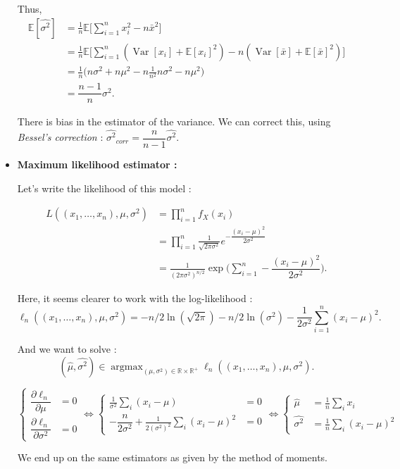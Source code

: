 \begin{itemize}
    Thus, 
    \begin{align*}
    \mathbb{E}[\widehat{\sigma^2}] &= \frac1{n} \mathbb{E}\Big[\displaystyle \sum\limits_{i=1}^n x_i^2 -  n\bar{x}^2 \Big] \\
    &= \frac1{n} \mathbb{E}\Bigg[\displaystyle \sum\limits_{i=1}^n (\operatorname{Var}[x_i] + \mathbb{E}[x_i]^2) -  n (\operatorname{Var}[\bar{x}] + \mathbb{E}[\bar{x}]^2) \Bigg]\\
    &= \frac1{n} \Big(n \sigma^2 + n\mu^2 - n \frac1{n^2} n \sigma^2 - n\mu^2 \Big)\\
    &= \dfrac{n-1}{n} \sigma^2.
    \end{align*}
    
    There is bias in the estimator of the variance. We can correct this, using \textit{Bessel's correction} : $\widehat{\sigma^2}_{corr} = \dfrac{n}{n-1} \widehat{\sigma^2}.$
    
    \item \textbf{Maximum likelihood estimator : }\newline
    
    Let's write the likelihood of this model :

    \begin{align*}
        L((x_1,\dots,x_n), \mu, \sigma^2) &= \displaystyle \prod_{i=1}^{n} f_X(x_i) \\
        &= \displaystyle \prod_{i=1}^{n} \frac1{\sqrt{2\pi\sigma^2}} e^{-\dfrac{(x_i - \mu)^2}{2\sigma^2}}\\
        &= \frac1{(2\pi\sigma^2)^{n/2}} \exp \Big( \displaystyle \sum\limits_{i=1}^n -\dfrac{(x_i - \mu)^2}{2\sigma^2}\Big).
    \end{align*}
    
    Here, it seems clearer to work with the log-likelihood :
    $$\ell_n((x_1,\dots,x_n), \mu, \sigma^2) = -n/2\ln(\sqrt{2\pi}) - n/2\ln(\sigma^2) - \frac1{2\sigma^2} \sum\limits_{i=1}^n (x_i - \mu)^2.$$
    
    And we want to solve :
    $$(\hat{\mu}, \widehat{\sigma^2}) \in \operatorname{argmax}_{(\mu, \sigma^2) \in \mathbb{R} \times \mathbb{R}^{+}} \ell_n((x_1,\dots,x_n), \mu, \sigma^2).$$
    
    
    $$\left\{\begin{array}{ll}
        \dfrac{\partial \ell_n}{\partial \mu} &= 0 \\
        \dfrac{\partial \ell_n}{\partial \sigma^2} &= 0
    \end{array}\right. \Leftrightarrow 
    \left\{\begin{array}{ll}
        \frac1{\sigma^2}\sum_i (x_i - \mu) &= 0 \\
        -\dfrac{n}{2\sigma^2} + \frac1{2(\sigma^2)^2}\sum_i (x_i - \mu)^2 &= 0
    \end{array}\right. \Leftrightarrow 
    \left\{\begin{array}{ll}
        \hat{\mu} &= \frac1{n}\sum_i x_i \\
        \widehat{\sigma^2} &= \frac1{n}\sum_i (x_i - \mu)^2
    \end{array}\right.$$
    
    We end up on the same estimators as given by the method of moments.
\end{itemize}
